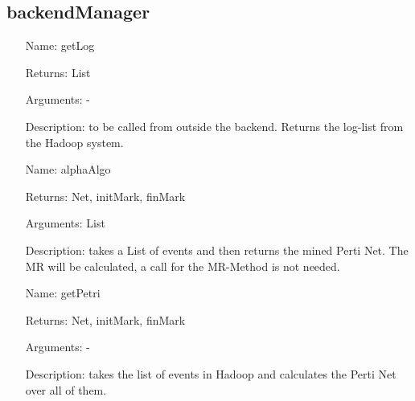 \documentclass[runningheads]{llncs}
\begin{document}
\subsection{backendManager}
\begin{itemize}
\item[Name:] getLog
\item[Returns:] List
\item[Arguments:] -
\item[Description:] to be called from outside the backend. Returns the log-list from the Hadoop system.
\end{itemize}
\begin{itemize}
\item[Name:] alphaAlgo
\item[Returns:] Net, initMark, finMark
\item[Arguments:] List
\item[Description:] takes a List of events and then returns the mined Perti Net. The MR will be calculated, a call for the MR-Method is not needed.
\end{itemize}

\begin{itemize}
\item[Name:] getPetri
\item[Returns:] Net, initMark, finMark
\item[Arguments:] -
\item[Description:] takes the list of events in Hadoop and calculates the Perti Net over all of them.
\end{itemize}





\end{document}
